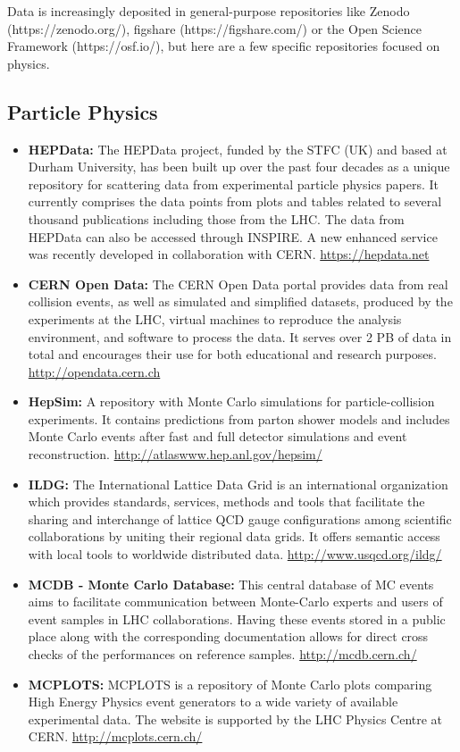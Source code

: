 Data is increasingly deposited in general-purpose repositories like
Zenodo (https://zenodo.org/), figshare (https://figshare.com/) or the
Open Science Framework (https://osf.io/), but here are a few specific
repositories focused on physics.
\subsection{Particle Physics}\label{databases:subsec:particlephysrep}

\begin{itemize}
\item
  \textbf{HEPData:} The HEPData project, funded by the STFC (UK) and
  based at Durham University, has been built up over the past four
  decades as a unique repository for scattering data from experimental
  particle physics papers. It currently comprises the data points from
  plots and tables related to several thousand publications including
  those from the LHC. The data from HEPData can also be accessed through
  INSPIRE. A new enhanced service was recently developed in
  collaboration with CERN. \url{https://hepdata.net}
\item
  \textbf{CERN Open Data:} The CERN Open Data portal provides data from
  real collision events, as well as simulated and simplified datasets,
  produced by the experiments at the LHC, virtual machines to reproduce
  the analysis environment, and software to process the data. It serves
  over 2 PB of data in total and encourages their use for both
  educational and research purposes. \url{http://opendata.cern.ch}
\item
  \textbf{HepSim:} A repository with Monte Carlo simulations for
  particle-collision experiments. It contains predictions from parton
  shower models and includes Monte Carlo events after fast and full
  detector simulations and event reconstruction.
  \url{http://atlaswww.hep.anl.gov/hepsim/}
\item
  \textbf{ILDG:} The International Lattice Data Grid is an international
  organization which provides standards, services, methods and tools
  that facilitate the sharing and interchange of lattice QCD gauge
  configurations among scientific collaborations by uniting their
  regional data grids. It offers semantic access with local tools to
  worldwide distributed data. \url{http://www.usqcd.org/ildg/}
\item
  \textbf{MCDB - Monte Carlo Database:} This central database of MC
  events aims to facilitate communication between Monte-Carlo experts
  and users of event samples in LHC collaborations. Having these events
  stored in a public place along with the corresponding documentation
  allows for direct cross checks of the performances on reference
  samples. \url{http://mcdb.cern.ch/}
\item
  \textbf{MCPLOTS:} MCPLOTS is a repository of Monte Carlo plots
  comparing High Energy Physics event generators to a wide variety of
  available experimental data. The website is supported by the LHC
  Physics Centre at CERN. \url{http://mcplots.cern.ch/}
\end{itemize}


